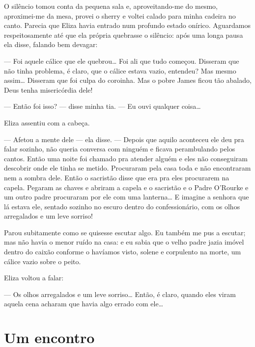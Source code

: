 O silêncio tomou conta da pequena sala e, aproveitando-me do mesmo,
aproximei-me da mesa, provei o sherry e voltei calado para minha
cadeira no canto. Parecia que Eliza havia entrado num profundo estado
onírico. Aguardamos respeitosamente até que ela própria quebrasse o
silêncio: após uma longa pausa ela disse, falando bem devagar:

--- Foi aquele cálice que ele quebrou\ldots{} Foi ali que tudo começou.
Disseram que não tinha problema, é claro, que o cálice estava vazio,
entendeu? Mas mesmo assim\ldots{} Disseram que foi culpa do coroinha. Mas o
pobre James ficou tão abalado, Deus tenha misericórdia dele!

--- Então foi isso? --- disse minha tia. --- Eu ouvi qualquer
coisa\ldots{}

Eliza assentiu com a cabeça.

--- Afetou a mente dele --- ela disse. --- Depois que aquilo aconteceu
ele deu pra falar sozinho, não queria conversa com ninguém e ficava
perambulando pelos cantos. Então uma noite foi chamado pra atender
alguém e eles não conseguiram descobrir onde ele tinha se metido.
Procuraram pela casa toda e não encontraram nem a sombra dele. Então
o sacristão disse que era pra eles procurarem na capela. Pegaram as
chaves e abriram a capela e o sacristão e o Padre O'Rourke e um outro
padre procuraram por ele com uma lanterna\ldots{} E imagine a senhora que
lá estava ele, sentado sozinho no escuro dentro do confessionário, com
os olhos arregalados e um leve sorriso!

Parou subitamente como se quisesse escutar algo. Eu também me pus a
escutar; mas não havia o menor ruído na casa: e eu sabia que o velho
padre jazia imóvel dentro do caixão conforme o havíamos visto, solene
e corpulento na morte, um cálice vazio sobre o peito.

Eliza voltou a falar:

--- Os olhos arregalados e um leve sorriso\ldots{} Então, é claro,
quando eles viram aquela cena acharam que havia algo errado com ele\ldots{}

\oneside

\chapter{Um encontro}


